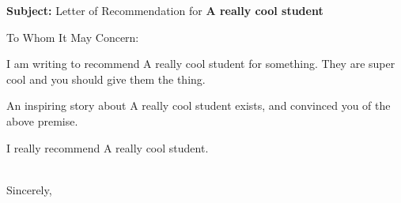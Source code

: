 \documentclass[10pt,letter]{letter}
\newcommand{\studentname}{A really cool student}
\begin{document}
\begin{letter}{\textbf{Subject:} Letter of Recommendation for \textbf{\studentname}}
\opening{To Whom It May Concern:}

I am writing to recommend A really cool student for something.
They are super cool and you should give them the thing.

\mycontext

An inspiring story about A really cool student exists, and convinced you of the
above premise.

I really recommend A really cool student.


\closing{~\\[2ex] Sincerely,}
\vfill
\end{letter}
\end{document}
